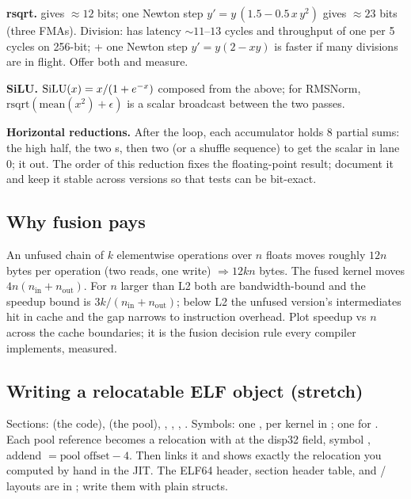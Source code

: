 \textbf{rsqrt.}  gives $\approx 12$ bits; one Newton step $y' = y\,(1.5 - 0.5\,x\,y^2)$ gives $\approx 23$ bits (three FMAs). Division:  has latency $\sim 11$--$13$ cycles and throughput of one per 5 cycles on 256-bit;  + one Newton step $y' = y(2 - xy)$ is faster if many divisions are in flight. Offer both and measure.

\textbf{SiLU.} $\operatorname{SiLU}(x) = x/(1 + e^{-x})$ composed from the above; for RMSNorm, $\text{rsqrt}(\text{mean}(x^2) + \epsilon)$ is a scalar broadcast between the two passes.

\textbf{Horizontal reductions.} After the loop, each accumulator  holds 8 partial sums:  the high half,  the two s, then two  (or a shuffle sequence) to get the scalar in lane 0;  it out. The order of this reduction fixes the floating-point result; document it and keep it stable across versions so that tests can be bit-exact.

\subsection{Why fusion pays}

An unfused chain of $k$ elementwise operations over $n$ floats moves roughly $12n$ bytes per operation (two reads, one write) $\Rightarrow 12kn$ bytes. The fused kernel moves $4n(n_{\text{in}} + n_{\text{out}})$. For $n$ larger than L2 both are bandwidth-bound and the speedup bound is $3k/(n_{\text{in}}+n_{\text{out}})$; below L2 the unfused version's intermediates hit in cache and the gap narrows to instruction overhead. Plot speedup vs $n$ across the cache boundaries; it is the fusion decision rule every compiler implements, measured.

\subsection{Writing a relocatable ELF object (stretch)}

Sections:  (the code),  (the pool), , , , . Symbols: one ,  per kernel in ; one  for . Each pool reference becomes a relocation  with  at the disp32 field, symbol , addend $= \text{pool offset} - 4$. Then  links it and  shows exactly the relocation you computed by hand in the JIT. The ELF64 header, section header table, and / layouts are in ; write them with plain structs.

